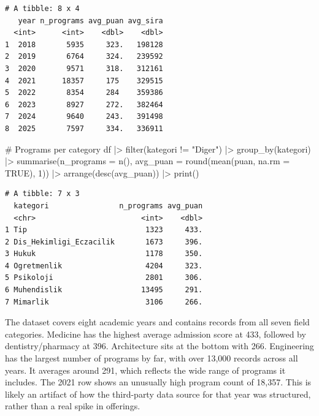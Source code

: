 \documentclass[
  11pt,
  a4paper,
  DIV=11,
  numbers=noendperiod]{scrartcl}
\newenvironment{Shaded}{\begin{snugshade}}{\end{snugshade}}
\newcommand{\AttributeTok}[1]{\textcolor[rgb]{0.40,0.45,0.13}{#1}}
\newcommand{\CommentTok}[1]{\textcolor[rgb]{0.37,0.37,0.37}{#1}}
\newcommand{\ConstantTok}[1]{\textcolor[rgb]{0.56,0.35,0.01}{#1}}
\newcommand{\DecValTok}[1]{\textcolor[rgb]{0.68,0.00,0.00}{#1}}
\newcommand{\FunctionTok}[1]{\textcolor[rgb]{0.28,0.35,0.67}{#1}}
\newcommand{\NormalTok}[1]{\textcolor[rgb]{0.00,0.23,0.31}{#1}}
\newcommand{\SpecialCharTok}[1]{\textcolor[rgb]{0.37,0.37,0.37}{#1}}
\newcommand{\StringTok}[1]{\textcolor[rgb]{0.13,0.47,0.30}{#1}}
\begin{document}
\begin{verbatim}
# A tibble: 8 x 4
   year n_programs avg_puan avg_sira
  <int>      <int>    <dbl>    <dbl>
1  2018       5935     323.   198128
2  2019       6764     324.   239592
3  2020       9571     318.   312161
4  2021      18357     175    329515
5  2022       8354     284    359386
6  2023       8927     272.   382464
7  2024       9640     243.   391498
8  2025       7597     334.   336911
\end{verbatim}

\begin{Shaded}
\begin{Highlighting}[]
\CommentTok{\# Programs per category}
\NormalTok{df }\SpecialCharTok{|\textgreater{}}
  \FunctionTok{filter}\NormalTok{(kategori }\SpecialCharTok{!=} \StringTok{"Diger"}\NormalTok{) }\SpecialCharTok{|\textgreater{}}
  \FunctionTok{group\_by}\NormalTok{(kategori) }\SpecialCharTok{|\textgreater{}}
  \FunctionTok{summarise}\NormalTok{(}\AttributeTok{n\_programs =} \FunctionTok{n}\NormalTok{(),}
            \AttributeTok{avg\_puan =} \FunctionTok{round}\NormalTok{(}\FunctionTok{mean}\NormalTok{(puan, }\AttributeTok{na.rm =} \ConstantTok{TRUE}\NormalTok{), }\DecValTok{1}\NormalTok{)) }\SpecialCharTok{|\textgreater{}}
  \FunctionTok{arrange}\NormalTok{(}\FunctionTok{desc}\NormalTok{(avg\_puan)) }\SpecialCharTok{|\textgreater{}}
  \FunctionTok{print}\NormalTok{()}
\end{Highlighting}
\end{Shaded}

\begin{verbatim}
# A tibble: 7 x 3
  kategori                n_programs avg_puan
  <chr>                        <int>    <dbl>
1 Tip                           1323     433.
2 Dis_Hekimligi_Eczacilik       1673     396.
3 Hukuk                         1178     350.
4 Ogretmenlik                   4204     323.
5 Psikoloji                     2801     306.
6 Muhendislik                  13495     291.
7 Mimarlik                      3106     266.
\end{verbatim}

The dataset covers eight academic years and contains records from all
seven field categories. Medicine has the highest average admission score
at 433, followed by dentistry/pharmacy at 396. Architecture sits at the
bottom with 266. Engineering has the largest number of programs by far,
with over 13,000 records across all years. It averages around 291, which
reflects the wide range of programs it includes. The 2021 row shows an
unusually high program count of 18,357. This is likely an artifact of
how the third-party data source for that year was structured, rather
than a real spike in offerings.
\end{document}
